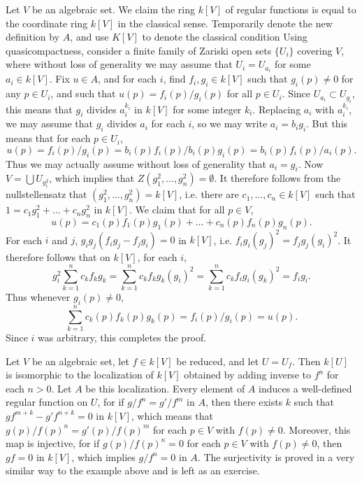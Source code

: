 \begin{example}
    Let $V$ be an algebraic set. We claim the ring $k[V]$ of regular functions is equal to the coordinate ring $k[V]$ in the classical sense. Temporarily denote the new definition by $A$, and use $K[V]$ to denote the classical condition Using quasicompactness, consider a finite family of Zariski open sets $\{ U_i \}$ covering $V$, where without loss of generality we may assume that $U_i = U_{a_i}$ for some $a_i \in k[V]$. Fix $u \in A$, and for each $i$, find $f_i,g_i \in k[V]$ such that $g_i(p) \neq 0$ for any $p \in U_i$, and such that $u(p) = f_i(p)/g_i(p)$ for all $p \in U_i$. Since $U_{a_i} \subset U_{g_i}$, this means that $g_i$ divides $a_i^{k_i}$ in $k[V]$ for some integer $k_i$. Replacing $a_i$ with $a_i^{k_i}$, we may assume that $g_i$ divides $a_i$ for each $i$, so we may write $a_i = b_i g_i$. But this means that for each $p \in U_i$,
    \[ u(p) = f_i(p)/g_i(p) = b_i(p) f_i(p) / b_i(p) g_i(p) = b_i(p) f_i(p) / a_i(p). \]
    Thus we may actually assume without loss of generality that $a_i = g_i$. Now $V = \bigcup U_{g_i^2}$, which implies that $Z(g_1^2,\dots,g_n^2) = \emptyset$. It therefore follows from the nullstellensatz that $(g_1^2,\dots,g_n^2) = k[V]$, i.e. there are $c_1,\dots,c_n \in k[V]$ such that $1 = c_1g_1^2 + \dots + c_ng_n^2$ in $k[V]$. We claim that for all $p \in V$,
    \[ u(p) = c_1(p) f_1(p) g_1(p) + \dots + c_n(p) f_n(p) g_n(p). \]
    For each $i$ and $j$, $g_ig_j(f_ig_j - f_jg_i) = 0$ in $k[V]$, i.e. $f_ig_i (g_j)^2 = f_jg_j (g_i)^2$. It therefore follows that on $k[V]$, for each $i$,
    \[ g_i^2 \sum_{k = 1}^n c_k f_k g_k = \sum_{k = 1}^n c_k f_k g_k (g_i)^2 = \sum_{k = 1}^n c_k f_i g_i (g_k)^2 = f_i g_i. \]
    Thus whenever $g_i(p) \neq 0$,
    \[ \sum_{k = 1}^n c_k(p) f_k(p) g_k(p) = f_i(p) / g_i(p) = u(p). \]
    Since $i$ was arbitrary, this completes the proof.
\end{example}

\begin{example}
    Let $V$ be an algebraic set, let $f \in k[V]$ be reduced, and let $U = U_f$. Then $k[U]$ is isomorphic to the localization of $k[V]$ obtained by adding inverse to $f^n$ for each $n > 0$. Let $A$ be this localization. Every element of $A$ induces a well-defined regular function on $U$, for if $g/f^n = g'/f^m$ in $A$, then there exists $k$ such that $gf^{m+k} - g'f^{n+k} = 0$ in $k[V]$, which means that $g(p)/f(p)^n = g'(p)/f(p)^m$ for each $p \in V$ with $f(p) \neq 0$. Moreover, this map is injective, for if $g(p)/f(p)^n = 0$ for each $p \in V$ with $f(p) \neq 0$, then $gf = 0$ in $k[V]$, which implies $g/f^n = 0$ in $A$. The surjectivity is proved in a very similar way to the example above and is left as an exercise.
\end{example}

